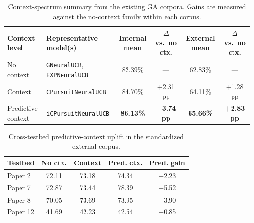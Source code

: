 \documentclass[conference]{IEEEtran}
\begin{document}
\begin{table}[t]
\caption{Context-spectrum summary from the existing GA corpora. Gains are measured
against the no-context family within each corpus.}
\label{tab:context_spectrum}
\centering
\small
\setlength{\tabcolsep}{5pt}
\begin{tabular}{p{}p{}cccc}
\toprule
\textbf{Context level} & \textbf{Representative model(s)} & \textbf{Internal mean} & \textbf{$\Delta$ vs.\ no ctx.} & \textbf{External mean} & \textbf{$\Delta$ vs.\ no ctx.} \\
\midrule
No context & \texttt{GNeuralUCB}, \texttt{EXPNeuralUCB} & 82.39\% & --- & 62.83\% & --- \\
Context & \texttt{CPursuitNeuralUCB} & 84.70\% & +2.31 pp & 64.11\% & +1.28 pp \\
Predictive context & \texttt{iCPursuitNeuralUCB} & \textbf{86.13\%} & \textbf{+3.74 pp} & \textbf{65.66\%} & \textbf{+2.83 pp} \\
\bottomrule
\end{tabular}
\end{table}

\begin{table}[t]
\caption{Cross-testbed predictive-context uplift in the standardized external
corpus.}
\label{tab:paper_context_uplift}
\centering
\small
\setlength{\tabcolsep}{4pt}
\begin{tabular}{lcccc}
\toprule
\textbf{Testbed} & \textbf{No ctx.} & \textbf{Context} & \textbf{Pred. ctx.} & \textbf{Pred. gain} \\
\midrule
Paper 2 & 72.11 & 73.18 & 74.34 & +2.23 \\
Paper 7 & 72.87 & 73.44 & 78.39 & +5.52 \\
Paper 8 & 70.05 & 73.69 & 73.95 & +3.90 \\
Paper 12 & 41.69 & 42.23 & 42.54 & +0.85 \\
\bottomrule
\end{tabular}
\end{table}
\end{document}
